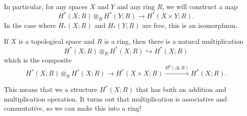 \documentclass{standalone}
\begin{document}
In particular, for any spaces \(X\) and \(Y\) and
any ring \(R\), we will construct a map
\[
  H^*(X; R) \otimes_R H^*(Y; R) \to H^*(X \times Y; R).
\]
In the case where \(H_*(X; R)\) and \(H_*(Y; R)\) are free,
this is an isomorphism.

\begin{corollary}
  If \(X\) is a topological space and \(R\) is a ring,
  then there is a natural multiplication
  \[
    H^*(X; R) \otimes_R H^*(X; R) \hookrightarrow H^*(X; R)
  \]
  which is the composite
  \[
    H^*(X; R) \otimes_R H^*(X; R) \to H^*(X \times X; R)
      \xrightarrow{H^q(\Delta; R)} H^*(X; R).
  \]
\end{corollary}

This means that we a structure \(H^*(X; R)\) that has both
an addition and multiplication operation.
It turns out that multiplication is associative and commutative,
so we can make this into a ring!
\end{document}
